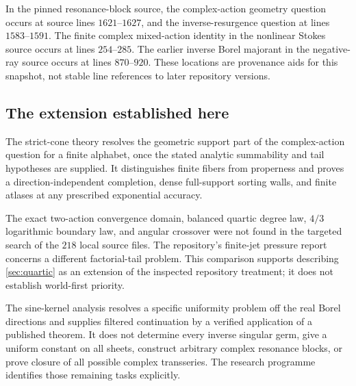 \documentclass[11pt,a4paper]{article}
\numberwithin{equation}{section}
\theoremstyle{definition}
\theoremstyle{remark}
\begin{document}
In the pinned resonance-block source, the complex-action geometry
question occurs at source lines $1621$--$1627$, and the
inverse-resurgence question at lines $1583$--$1591$.
The finite complex mixed-action identity in the nonlinear Stokes
source occurs at lines $254$--$285$.
The earlier inverse Borel majorant in the negative-ray source
occurs at lines $870$--$920$.
These locations are provenance aids for this snapshot, not stable
line references to later repository versions.

\subsection{The extension established here}

The strict-cone theory resolves the geometric support part of the
complex-action question for a finite alphabet, once the stated
analytic summability and tail hypotheses are supplied.
It distinguishes finite fibers from properness and proves a
direction-independent completion, dense full-support sorting
walls, and finite atlases at any prescribed exponential accuracy.

The exact two-action convergence domain, balanced quartic degree
law, $4/3$ logarithmic boundary law, and angular crossover were not
found in the targeted search of the $218$ local source files.
The repository's finite-jet pressure report concerns a different
factorial-tail problem. This comparison supports describing
\cref{sec:quartic} as an extension of the inspected repository
treatment; it does not establish world-first priority.

The sine-kernel analysis resolves a specific uniformity problem
off the real Borel directions and supplies filtered continuation
by a verified application of a published theorem.
It does not determine every inverse singular germ, give a uniform
constant on all sheets, construct arbitrary complex resonance
blocks, or prove closure of all possible complex transseries.
The research programme identifies those remaining tasks explicitly.
\end{document}
